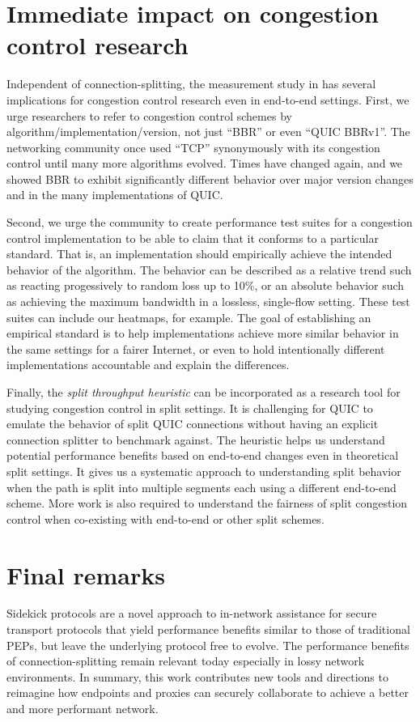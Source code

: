 \section{Immediate impact on congestion control research}
\label{sec:conclusion:congestion}

Independent of connection-splitting, the measurement study in
 has several implications for congestion control research
even in end-to-end settings. First, we urge researchers to refer
to congestion control schemes by algorithm/implementation/version, not just
``BBR'' or even ``QUIC BBRv1''. The networking community once used ``TCP''
synonymously with its congestion control until many more algorithms evolved.
Times have changed again, and we showed BBR to exhibit significantly different
behavior over major version changes and in the many implementations of QUIC.

Second, we urge the community to create performance test suites for a congestion
control implementation to be able to claim that it conforms to a particular
standard. That is, an implementation should empirically achieve the intended
behavior of the algorithm. The behavior can be described as a relative trend
such as reacting progessively to random loss up to 10\%, or an absolute
behavior such as achieving the maximum bandwidth in a lossless, single-flow
setting. These test suites can include our heatmaps, for example. The goal of
establishing an empirical standard is to help implementations achieve more
similar behavior in the same settings for a fairer Internet, or even to hold
intentionally different implementations accountable and explain the differences.

Finally, the \textit{split throughput heuristic} can be incorporated as a
research tool for studying congestion control in split settings. It is
challenging for QUIC to emulate the behavior of split QUIC connections without
having an explicit connection splitter to benchmark against. The heuristic
helps us understand potential performance benefits based on end-to-end changes
even in theoretical split settings. It gives us a systematic approach to
understanding split behavior when the path is split into multiple segments each
using a different end-to-end scheme. More work is also required to understand
the fairness of split congestion control when co-existing with end-to-end or
other split schemes. 

\section{Final remarks}
\label{sec:conclusion:remarks}

Sidekick protocols are a novel approach to in-network assistance for secure
transport protocols that yield performance benefits similar to those of
traditional PEPs, but leave the underlying protocol free to evolve.
The performance benefits of connection-splitting remain relevant today
especially in lossy network environments. In summary, this work contributes
new tools and directions to reimagine how endpoints and proxies can securely
collaborate to achieve a better and more performant network.
